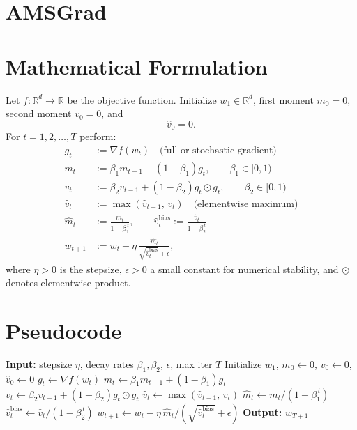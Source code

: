 \documentclass{article}
\begin{document}
\section*{AMSGrad}

\section*{Mathematical Formulation}
Let $f:\mathbb{R}^d\rightarrow\mathbb{R}$ be the objective function.  
Initialize $w_1\in\mathbb{R}^d$, first moment $m_0=0$, second moment $v_0=0$, and
\[
\hat v_0 =0.
\]
For $t=1,2,\dots,T$ perform:
\begin{align}
g_t &:= \nabla f(w_t) \quad\text{(full or stochastic gradient)}\\[2mm]
m_t &:= \beta_1 m_{t-1} + (1-\beta_1) g_t, \qquad \beta_1\in[0,1)\\[2mm]
v_t &:= \beta_2 v_{t-1} + (1-\beta_2) g_t\odot g_t,\qquad \beta_2\in[0,1)\\[2mm]
\hat v_t &:= \max(\hat v_{t-1},\, v_t)\quad\text{(elementwise maximum)}\\[2mm]
\hat m_t &:= \frac{m_t}{1-\beta_1^{\,t}},\qquad
\hat v_t^{\text{bias}} := \frac{\hat v_t}{1-\beta_2^{\,t}}\\[2mm]
w_{t+1} &:= w_t - \eta\,\frac{\hat m_t}{\sqrt{\hat v_t^{\text{bias}}}+\epsilon},
\end{align}
where $\eta>0$ is the stepsize, $\epsilon>0$ a small constant for numerical stability,
and $\odot$ denotes elementwise product.

\section*{Pseudocode}
\begin{algorithm}[H]
\caption{AMSGrad}
\begin{algorithmic}[1]
\State \textbf{Input:} stepsize $\eta$, decay rates $\beta_1,\beta_2$, $\epsilon$, max iter $T$
\State Initialize $w_1$, $m_0\gets 0$, $v_0\gets 0$, $\hat v_0\gets 0$
    \State $g_t \gets \nabla f(w_t)$
    \State $m_t \gets \beta_1 m_{t-1} + (1-\beta_1) g_t$
    \State $v_t \gets \beta_2 v_{t-1} + (1-\beta_2) g_t\odot g_t$
    \State $\hat v_t \gets \max(\hat v_{t-1},\, v_t)$ 
    \State $\hat m_t \gets m_t/(1-\beta_1^{\,t})$
    \State $\hat v_t^{\text{bias}} \gets \hat v_t/(1-\beta_2^{\,t})$
    \State $w_{t+1} \gets w_t - \eta\,\hat m_t/(\sqrt{\hat v_t^{\text{bias}}}+\epsilon)$
\EndFor
\State \textbf{Output:} $w_{T+1}$
\end{algorithmic}
\end{algorithm}
\end{document}
